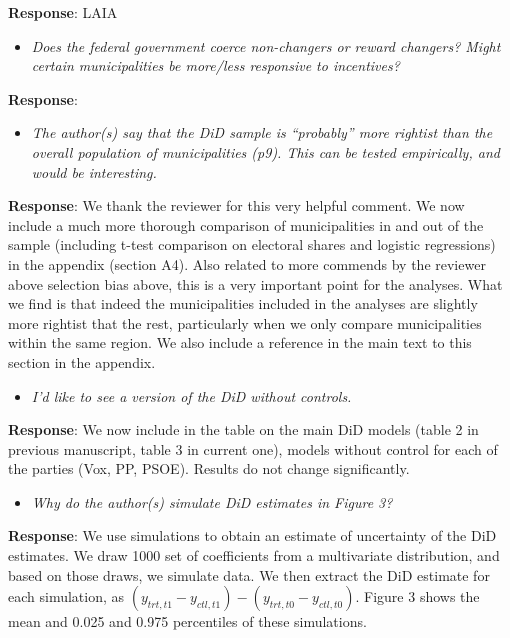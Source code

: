 \documentclass[12pt, a4paper, notitlepage]{article}
\begin{document}
\textbf{Response}: {\color{red}{pending} LAIA}

\begin{itemize}
  \item \textit{Does the federal government coerce non-changers or reward changers? Might certain
  municipalities be more/less responsive to incentives?}
\end{itemize}

\textbf{Response}: {\color{red}{pending}}

\begin{itemize}
  \item \textit{The author(s) say that the DiD sample is “probably” more rightist than the overall
  population of municipalities (p9). This can be tested empirically, and would be
  interesting.}
\end{itemize}

\textbf{Response}: We thank the reviewer for this very helpful comment. We now include a much more thorough comparison of municipalities in and out of the sample (including t-test comparison on electoral shares and logistic regressions) in the appendix (section A4). Also related to more commends by the reviewer above selection bias above, this is a very important point for the analyses. What we find is that indeed the municipalities included in the analyses are slightly more rightist that the rest, particularly when we only compare municipalities within the same region.
We also include a reference in the main text to this section in the appendix.

\begin{itemize}
  \item \textit{I’d like to see a version of the DiD without controls.}
\end{itemize}

\textbf{Response}: We now include in the table on the main DiD models (table 2 in previous manuscript, table 3 in current one), models without control for each of the parties (Vox, PP, PSOE). Results do not change significantly.

\begin{itemize}
  \item \textit{Why do the author(s) simulate DiD estimates in Figure 3?}
\end{itemize}

\textbf{Response}: We use simulations to obtain an estimate of uncertainty of the DiD estimates. We draw 1000 set of coefficients from a multivariate distribution, and based on those draws, we simulate data. We then extract the DiD estimate for each simulation, as $(y_{trt, t1} - y_{ctl, t1})-(y_{trt, t0} - y_{ctl, t0})$.
Figure 3 shows the mean and 0.025 and 0.975 percentiles of these simulations.
\end{document}
